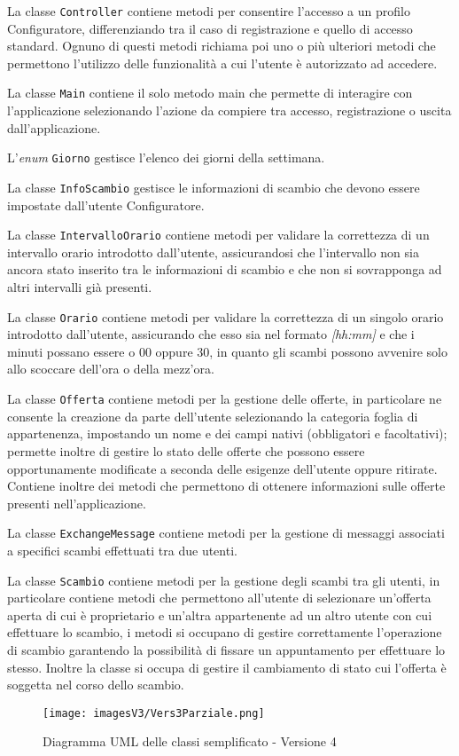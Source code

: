 La classe \texttt{Controller} contiene metodi per consentire l'accesso a un profilo Configuratore, differenziando tra il caso di registrazione e quello di accesso standard. Ognuno di questi metodi richiama poi uno o più ulteriori metodi che permettono l'utilizzo delle funzionalità a cui l'utente è autorizzato ad accedere.

La classe \texttt{Main} contiene il solo metodo main che permette di interagire con l'applicazione selezionando l'azione da compiere tra accesso, registrazione o uscita dall'applicazione.

L'\textit{enum} \texttt{Giorno} gestisce l'elenco dei giorni della settimana.

La classe \texttt{InfoScambio} gestisce le informazioni di scambio che devono essere impostate dall'utente Configuratore.

La classe \texttt{IntervalloOrario} contiene metodi per validare la correttezza di un intervallo orario introdotto dall'utente, assicurandosi che l'intervallo non sia ancora stato inserito tra le informazioni di scambio e che non si sovrapponga ad altri intervalli già presenti.

La classe \texttt{Orario} contiene metodi per validare la correttezza di un singolo orario introdotto dall'utente, assicurando che esso sia nel formato \textit{[hh:mm]} e che i minuti possano essere o 00 oppure 30, in quanto gli scambi possono avvenire solo allo scoccare dell'ora o della mezz'ora.

La classe \texttt{Offerta} contiene metodi per la gestione delle offerte, in particolare ne consente la creazione da parte dell'utente selezionando la categoria foglia di appartenenza, impostando un nome e dei campi nativi (obbligatori e facoltativi); permette inoltre di gestire lo stato delle offerte che possono essere opportunamente modificate a seconda delle esigenze dell'utente oppure ritirate. Contiene inoltre dei metodi che permettono di ottenere informazioni sulle offerte presenti nell'applicazione.

La classe \texttt{ExchangeMessage} contiene metodi per la gestione di messaggi associati a specifici scambi effettuati tra due utenti.

La classe \texttt{Scambio} contiene metodi per la gestione degli scambi tra gli utenti, in particolare contiene metodi che permettono all'utente di selezionare un'offerta aperta di cui è proprietario e un'altra appartenente ad un altro utente con cui effettuare lo scambio, i metodi si occupano di gestire correttamente l'operazione di scambio garantendo la possibilità di fissare un appuntamento per effettuare lo stesso. Inoltre la classe si occupa di gestire il cambiamento di stato cui l'offerta è soggetta nel corso dello scambio.

\begin{figure}[bh]
    \centering
    \texttt{[image: imagesV3/Vers3Parziale.png]}
    \caption{\label{fig:Simplified Class Diagram - v4}Diagramma UML delle classi semplificato - Versione 4}
\end{figure}
\bigskip
